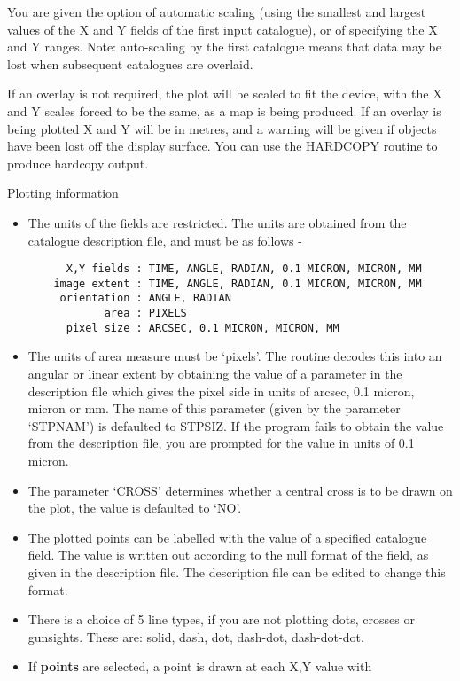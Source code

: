 You are given the option of automatic scaling (using the smallest
and largest values of the X and Y fields of the first input
catalogue), or of specifying the X and Y ranges.  
Note: auto-scaling by the first catalogue means that data may be lost 
when subsequent catalogues are overlaid.

If an overlay is not required, the plot will be scaled to fit the
device, with the X and Y scales forced to be the same, as a map is
being produced.  
If an overlay is being plotted X and Y will be in metres, and a warning 
will be given if objects have been lost off the display surface.
You can use the HARDCOPY routine to produce hardcopy output.

\begin{description}
\item{Plotting information} 
 \begin{itemize}
\item The units of the fields are restricted.
The units are obtained from the catalogue description file, and must
be as follows -
\begin{verbatim}
      X,Y fields : TIME, ANGLE, RADIAN, 0.1 MICRON, MICRON, MM
    image extent : TIME, ANGLE, RADIAN, 0.1 MICRON, MICRON, MM
     orientation : ANGLE, RADIAN
            area : PIXELS
      pixel size : ARCSEC, 0.1 MICRON, MICRON, MM
\end{verbatim}
\item The units of area measure must be `pixels'. 
The routine decodes this into an angular or linear extent by obtaining 
the value of a parameter in the description file which gives the pixel 
side in units of arcsec, 0.1 micron, micron or mm.  
The name of this parameter (given by the parameter `STPNAM') is defaulted 
to STPSIZ.  
If the program fails to obtain the value from the description file, you are
prompted for the value in units of 0.1 micron.
\item The parameter `CROSS' determines whether a central cross is to be
drawn on the plot, the value is defaulted to `NO'.
\item The plotted points can be labelled with the value of a specified
catalogue field.  
The value is written out according to the null format of the field, as given 
in the description file.
The description file can be edited to change this format.
\item There is a choice of 5 line types, if you are not plotting dots,
crosses or gunsights.  
These are: solid, dash, dot, dash-dot, dash-dot-dot.
\item If {\bf points} are selected, a point is drawn at each X,Y value with 

\end{itemize}
\end{description}
